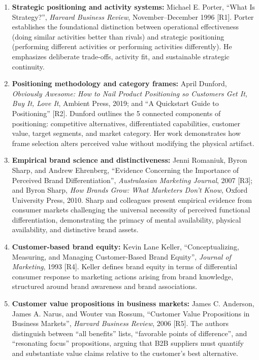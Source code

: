 \begin{enumerate}
    \item \textbf{Strategic positioning and activity systems:} Michael E. Porter, ``What Is Strategy?'', \emph{Harvard Business Review}, November--December 1996 [R1]. Porter establishes the foundational distinction between operational effectiveness (doing similar activities better than rivals) and strategic positioning (performing different activities or performing activities differently). He emphasizes deliberate trade-offs, activity fit, and sustainable strategic continuity.
    \item \textbf{Positioning methodology and category frames:} April Dunford, \emph{Obviously Awesome: How to Nail Product Positioning so Customers Get It, Buy It, Love It}, Ambient Press, 2019; and ``A Quickstart Guide to Positioning'' [R2]. Dunford outlines the 5 connected components of positioning: competitive alternatives, differentiated capabilities, customer value, target segments, and market category. Her work demonstrates how frame selection alters perceived value without modifying the physical artifact.
    \item \textbf{Empirical brand science and distinctiveness:} Jenni Romaniuk, Byron Sharp, and Andrew Ehrenberg, ``Evidence Concerning the Importance of Perceived Brand Differentiation'', \emph{Australasian Marketing Journal}, 2007 [R3]; and Byron Sharp, \emph{How Brands Grow: What Marketers Don't Know}, Oxford University Press, 2010. Sharp and colleagues present empirical evidence from consumer markets challenging the universal necessity of perceived functional differentiation, demonstrating the primacy of mental availability, physical availability, and distinctive brand assets.
    \item \textbf{Customer-based brand equity:} Kevin Lane Keller, ``Conceptualizing, Measuring, and Managing Customer-Based Brand Equity'', \emph{Journal of Marketing}, 1993 [R4]. Keller defines brand equity in terms of differential consumer response to marketing actions arising from brand knowledge, structured around brand awareness and brand associations.
    \item \textbf{Customer value propositions in business markets:} James C. Anderson, James A. Narus, and Wouter van Rossum, ``Customer Value Propositions in Business Markets'', \emph{Harvard Business Review}, 2006 [R5]. The authors distinguish between ``all benefits'' lists, ``favorable points of difference'', and ``resonating focus'' propositions, arguing that B2B suppliers must quantify and substantiate value claims relative to the customer's best alternative.

\end{enumerate}
